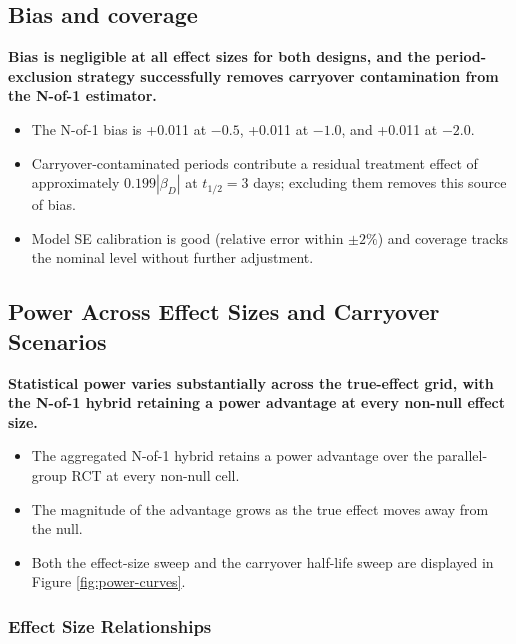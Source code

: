 \documentclass[
  11pt,
]{article}
\begin{document}
\subsection{Bias and coverage}\label{sec:bias}

\textbf{Bias is negligible at all effect sizes for both designs, and the period-exclusion strategy successfully removes carryover contamination from the N-of-1 estimator.}

\begin{itemize}\setlength{\itemsep}{2pt}\setlength{\parskip}{0pt}
\item The N-of-1 bias is +0.011 at $-0.5$, +0.011 at $-1.0$, and +0.011 at $-2.0$.
\item Carryover-contaminated periods contribute a residual treatment effect of approximately $0.199|\beta_D|$ at $t_{1/2} = 3$ days; excluding them removes this source of bias.
\item Model SE calibration is good (relative error within $\pm 2\%$) and coverage tracks the nominal level without further adjustment.
\end{itemize}

\subsection{Power Across Effect Sizes and Carryover Scenarios}\label{power-across-effect-sizes-and-carryover-scenarios}

\textbf{Statistical power varies substantially across the true-effect grid, with the N-of-1 hybrid retaining a power advantage at every non-null effect size.}

\begin{itemize}\setlength{\itemsep}{2pt}\setlength{\parskip}{0pt}
\item The aggregated N-of-1 hybrid retains a power advantage over the parallel-group RCT at every non-null cell.
\item The magnitude of the advantage grows as the true effect moves away from the null.
\item Both the effect-size sweep and the carryover half-life sweep are displayed in Figure \ref{fig:power-curves}.
\end{itemize}

\subsubsection{Effect Size Relationships}\label{effect-size-relationships}
\end{document}
